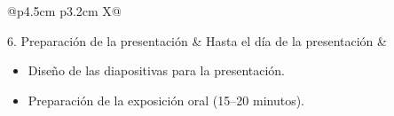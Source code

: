 \documentclass[12pt,a4paper,oneside]{report}
\begin{document}
\begin{table}[ht]
\begin{tabularx}{\textwidth}{@{}p{4.5cm} p{3.2cm} X@{}}
    \midrule

    6. Preparación de la presentación
      & Hasta el día de la presentación
      & \begin{minipage}[t]{\linewidth}
          \begin{itemize}
            \item Diseño de las diapositivas para la presentación.
            \item Preparación de la exposición oral (15--20 minutos).
          \end{itemize}
        \end{minipage} \\

    \bottomrule
    \end{tabularx}
    \end{table}
\end{document}
